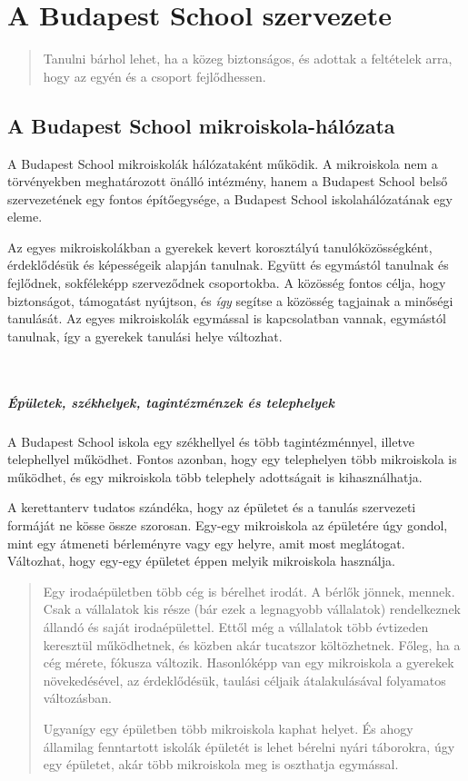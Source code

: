 
\chapter{A Budapest School szervezete}
\begin{quote}
Tanulni bárhol lehet, ha a közeg biztonságos, és adottak a feltételek arra, hogy az egyén és a csoport fejlődhessen.
\end{quote}

\section{A Budapest School mikroiskola-hálózata}

 A Budapest School mikroiskolák hálózataként működik. A mikroiskola nem a
 törvényekben meghatározott önálló intézmény, hanem a Budapest School belső
 szervezetének egy fontos építőegysége, a Budapest School iskolahálózatának egy eleme.

Az egyes mikroiskolákban a gyerekek kevert korosztályú tanulóközösségként,
érdeklődésük és képességeik alapján tanulnak. Együtt és egymástól tanulnak és fejlődnek,
sokféleképp szerveződnek csoportokba. A közösség
fontos célja, hogy biztonságot, támogatást nyújtson, és \emph{így} segítse a közösség tagjainak a
minőségi tanulását. Az egyes mikroiskolák egymással is kapcsolatban vannak,
egymástól tanulnak, így a gyerekek tanulási helye változhat.

 \paragraph{Épületek, székhelyek, tagintézménzek és telephelyek}
A Budapest School iskola egy székhellyel és több tagintézménnyel, illetve telephellyel működhet. Fontos azonban, hogy egy telephelyen több mikroiskola is működhet, és egy mikroiskola több telephely adottságait is kihasználhatja.

A kerettanterv tudatos szándéka, hogy az épületet és a
tanulás szervezeti formáját ne kösse össze szorosan. Egy-egy mikroiskola az épületére úgy gondol, mint egy átmeneti bérleményre vagy egy helyre, amit most meglátogat.
Változhat, hogy egy-egy épületet éppen melyik mikroiskola használja.


 \begin{quote}
Egy irodaépületben több cég is bérelhet irodát. A bérlők jönnek, mennek. Csak a vállalatok kis része (bár ezek a legnagyobb vállalatok) rendelkeznek állandó és saját irodaépülettel. Ettől még a vállalatok több évtizeden keresztül működhetnek, és közben akár tucatszor költözhetnek. Főleg, ha a cég mérete, fókusza változik. Hasonlóképp van egy mikroiskola a gyerekek növekedésével, az érdeklődésük, taulási céljaik átalakulásával folyamatos változásban.

Ugyanígy egy épületben több mikroiskola kaphat helyet. És ahogy államilag fenntartott iskolák épületét is lehet bérelni nyári táborokra, úgy egy épületet, akár több mikroiskola meg is oszthatja egymással.
\end{quote}

